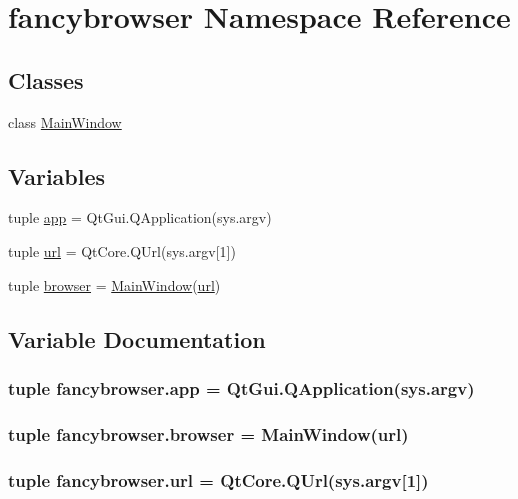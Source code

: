 \hypertarget{namespacefancybrowser}{}\section{fancybrowser Namespace Reference}
\label{namespacefancybrowser}
\subsection*{Classes}
\begin{DoxyCompactItemize}
\item 
class \hyperlink{classfancybrowser_1_1MainWindow}{Main\+Window}
\end{DoxyCompactItemize}
\subsection*{Variables}
\begin{DoxyCompactItemize}
\item 
tuple \hyperlink{namespacefancybrowser_a03ad1d9a3ee90af438dd15d57fa91491}{app} = Qt\+Gui.\+Q\+Application(sys.\+argv)
\item 
tuple \hyperlink{namespacefancybrowser_adc45d81b15ed601b2fc62a488241c0a3}{url} = Qt\+Core.\+Q\+Url(sys.\+argv\mbox{[}1\mbox{]})
\item 
tuple \hyperlink{namespacefancybrowser_a25a22eceb6743ee5b968df2c18dba0bf}{browser} = \hyperlink{classfancybrowser_1_1MainWindow}{Main\+Window}(\hyperlink{namespacefancybrowser_adc45d81b15ed601b2fc62a488241c0a3}{url})
\end{DoxyCompactItemize}


\subsection{Variable Documentation}
\hypertarget{namespacefancybrowser_a03ad1d9a3ee90af438dd15d57fa91491}{}
\subsubsection[{app}]{\setlength{\rightskip}{0pt plus 5cm}tuple fancybrowser.\+app = Qt\+Gui.\+Q\+Application(sys.\+argv)}\label{namespacefancybrowser_a03ad1d9a3ee90af438dd15d57fa91491}
\hypertarget{namespacefancybrowser_a25a22eceb6743ee5b968df2c18dba0bf}{}
\subsubsection[{browser}]{\setlength{\rightskip}{0pt plus 5cm}tuple fancybrowser.\+browser = {\bf Main\+Window}({\bf url})}\label{namespacefancybrowser_a25a22eceb6743ee5b968df2c18dba0bf}
\hypertarget{namespacefancybrowser_adc45d81b15ed601b2fc62a488241c0a3}{}
\subsubsection[{url}]{\setlength{\rightskip}{0pt plus 5cm}tuple fancybrowser.\+url = Qt\+Core.\+Q\+Url(sys.\+argv\mbox{[}1\mbox{]})}\label{namespacefancybrowser_adc45d81b15ed601b2fc62a488241c0a3}
